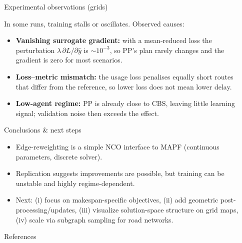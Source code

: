 \documentclass[final]{beamer}
\newlength{\sepwidth}
\newlength{\colwidth}
\newcommand{\separatorcolumn}{\begin{column}{\sepwidth}\end{column}}
\begin{document}
\begin{frame}[t]
\begin{columns}[t]
\begin{column}{\colwidth}
\begin{block}{Experimental observations (grids)}
  \vspace{0.4em}
  

  In some runs, training stalls or oscillates.
  Observed causes:
  \begin{itemize}
    \item \textbf{Vanishing surrogate gradient:} with a mean-reduced loss the perturbation $\lambda\,\partial L/\partial\hat y$ is $\sim 10^{-3}$, so PP's plan rarely changes and the gradient is zero for most scenarios.
    \item \textbf{Loss--metric mismatch:} the usage loss penalises equally short routes that differ from the reference, so lower loss does not mean lower delay.
    \item \textbf{Low-agent regime:} PP is already close to CBS, leaving little learning signal; validation noise then exceeds the effect.
  \end{itemize}
\end{block}

\begin{alertblock}{Conclusions \& next steps}
  \begin{itemize}
    \item Edge-reweighting is a simple NCO interface to MAPF (continuous parameters, discrete solver).
    \item Replication suggests improvements are possible, but training can be unstable and highly regime-dependent.
    \item Next: (i) focus on makespan-specific objectives, (ii) add geometric post-processing/updates, (iii) visualize solution-space structure on grid maps, (iv) scale via subgraph sampling for road networks.
  \end{itemize}
\end{alertblock}


\begin{block}{References}
  \footnotesize{}
\end{block}

\end{column}
\separatorcolumn



\end{columns}
\end{frame}
\end{document}
